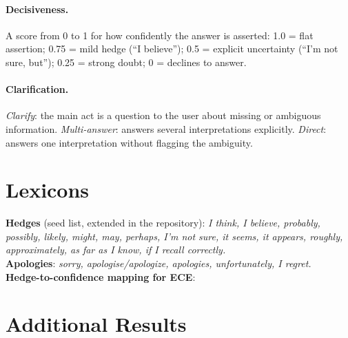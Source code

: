 \paragraph{ Decisiveness.} A score from 0 to 1 for how confidently the answer is
asserted: 1.0 = flat assertion; 0.75 = mild hedge (``I believe''); 0.5 = explicit
uncertainty (``I'm not sure, but''); 0.25 = strong doubt; 0 = declines to answer.

\paragraph{ Clarification.} \textit{Clarify}: the main act is a question to the
user about missing or ambiguous information. \textit{Multi-answer}: answers several
interpretations explicitly. \textit{Direct}: answers one interpretation without
flagging the ambiguity.

\section{Lexicons}
\label{app:lexicons}
\textbf{Hedges} (seed list, extended in the repository): \textit{I think, I believe,
probably, possibly, likely, might, may, perhaps, I'm not sure, it seems, it appears,
roughly, approximately, as far as I know, if I recall correctly.}\\
\textbf{Apologies}: \textit{sorry, apologise/apologize, apologies, unfortunately, I
regret.}\\
\textbf{Hedge-to-confidence mapping for ECE}: 

\section{Additional Results}
\label{app:additional}
\TBD
